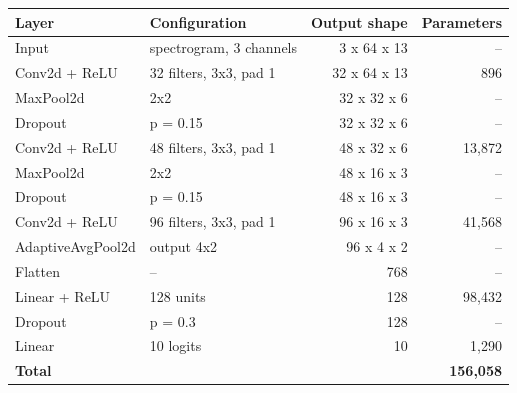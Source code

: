 \begin{tabular}{llrr}
\toprule
Layer & Configuration & Output shape & Parameters \\
\midrule
Input & spectrogram, 3 channels & 3 x 64 x 13 & -- \\
Conv2d + ReLU & 32 filters, 3x3, pad 1 & 32 x 64 x 13 & 896 \\
MaxPool2d & 2x2 & 32 x 32 x 6 & -- \\
Dropout & p = 0.15 & 32 x 32 x 6 & -- \\
Conv2d + ReLU & 48 filters, 3x3, pad 1 & 48 x 32 x 6 & 13{,}872 \\
MaxPool2d & 2x2 & 48 x 16 x 3 & -- \\
Dropout & p = 0.15 & 48 x 16 x 3 & -- \\
Conv2d + ReLU & 96 filters, 3x3, pad 1 & 96 x 16 x 3 & 41{,}568 \\
AdaptiveAvgPool2d & output 4x2 & 96 x 4 x 2 & -- \\
Flatten & -- & 768 & -- \\
Linear + ReLU & 128 units & 128 & 98{,}432 \\
Dropout & p = 0.3 & 128 & -- \\
Linear & 10 logits & 10 & 1{,}290 \\
\midrule
\textbf{Total} & & & \textbf{156{,}058} \\
\bottomrule
\end{tabular}